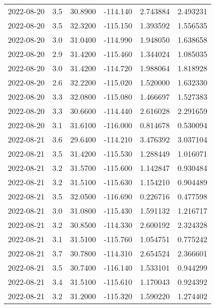 \begin{tabular}{lrrrrr}
2022-08-20 &       3.5 &  30.8900 &  -114.140 &         2.743884 &         2.493231 \\
2022-08-20 &       3.5 &  32.3200 &  -115.150 &         1.393592 &         1.556535 \\
2022-08-20 &       3.0 &  31.0400 &  -114.990 &         1.948050 &         1.638658 \\
2022-08-20 &       2.9 &  31.4200 &  -115.460 &         1.344024 &         1.085035 \\
2022-08-20 &       3.0 &  31.4200 &  -114.720 &         1.988064 &         1.818928 \\
2022-08-20 &       2.6 &  32.2200 &  -115.020 &         1.520000 &         1.632330 \\
2022-08-20 &       3.3 &  32.0800 &  -115.080 &         1.466697 &         1.527383 \\
2022-08-20 &       3.3 &  30.6600 &  -114.440 &         2.616028 &         2.291659 \\
2022-08-20 &       3.1 &  31.6100 &  -116.000 &         0.814678 &         0.530094 \\
2022-08-21 &       3.6 &  29.6400 &  -114.210 &         3.476392 &         3.037104 \\
2022-08-21 &       3.5 &  31.4200 &  -115.530 &         1.288449 &         1.016071 \\
2022-08-21 &       3.2 &  31.5700 &  -115.600 &         1.142847 &         0.930484 \\
2022-08-21 &       3.2 &  31.5100 &  -115.630 &         1.154210 &         0.904489 \\
2022-08-21 &       3.5 &  32.0500 &  -116.690 &         0.226716 &         0.477598 \\
2022-08-21 &       3.0 &  31.0800 &  -115.430 &         1.591132 &         1.216717 \\
2022-08-21 &       3.2 &  30.8500 &  -114.330 &         2.600192 &         2.324328 \\
2022-08-21 &       3.1 &  31.5100 &  -115.760 &         1.054751 &         0.775242 \\
2022-08-21 &       3.7 &  30.7800 &  -114.310 &         2.654524 &         2.366601 \\
2022-08-21 &       3.5 &  30.7400 &  -116.140 &         1.533101 &         0.944299 \\
2022-08-21 &       3.4 &  31.5100 &  -115.610 &         1.170043 &         0.924392 \\
2022-08-21 &       3.2 &  31.2000 &  -115.320 &         1.590220 &         1.274402 \\

\end{tabular}
